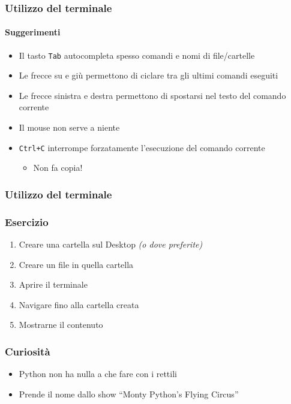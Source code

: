 \begin{contentframe}
    \frametitle{Utilizzo del terminale}
    \framesubtitle{Suggerimenti}

    \begin{itemize}
        \item Il tasto \texttt{Tab} autocompleta spesso comandi e nomi di file/cartelle

        \bigskip
        \item Le frecce su e giù permettono di ciclare tra gli ultimi comandi eseguiti
        \item Le frecce sinistra e destra permettono di spostarsi nel testo del comando corrente
        
        \bigskip
        \item Il mouse non serve a niente

        \bigskip
        \item \texttt{Ctrl+C} interrompe forzatamente l'esecuzione del comando corrente
        \begin{itemize}
            \item Non fa copia!
        \end{itemize}
    \end{itemize}
\end{contentframe}

\begin{exerciseframe}
    \frametitle{Utilizzo del terminale}
    \frametitle{Esercizio}

    \begin{enumerate}
        \item Creare una cartella sul Desktop \textit{(o dove preferite)}
        \item Creare un file in quella cartella
        \item Aprire il terminale
        \item Navigare fino alla cartella creata
        \item Mostrarne il contenuto
    \end{enumerate}
\end{exerciseframe}


\begin{exampleframe}
    \frametitle{Curiosità}

    \begin{itemize}
        \item Python non ha nulla a che fare con i rettili
        \item Prende il nome dallo show ``Monty Python's Flying Circus''
    \end{itemize}

    \bigskip
    \begin{columns}
        \centering
        
        \centering
    \end{columns}
\end{exampleframe}

